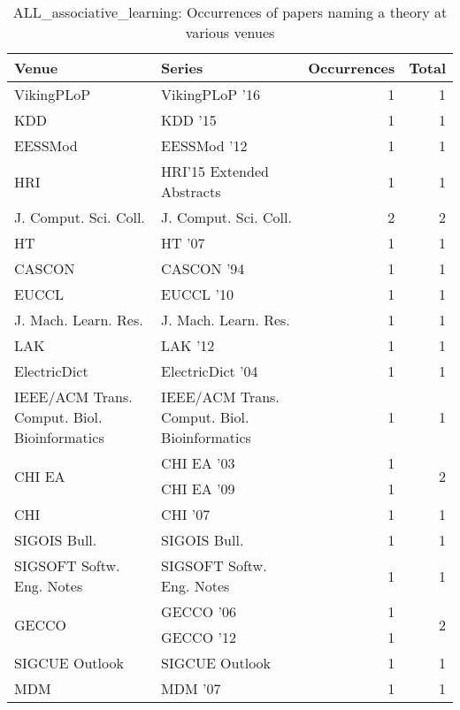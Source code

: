 \begin{table*}[t]
\begin{tabular}{llrr}
Venue & Series & Occurrences & Total\\\hline
\multirow{1}{*}{VikingPLoP } & VikingPLoP '16 & 1 & \multirow{1}{*}{1}\\
\multirow{1}{*}{KDD } & KDD '15 & 1 & \multirow{1}{*}{1}\\
\multirow{1}{*}{EESSMod } & EESSMod '12 & 1 & \multirow{1}{*}{1}\\
\multirow{1}{*}{HRI} & HRI'15 Extended Abstracts & 1 & \multirow{1}{*}{1}\\
\multirow{1}{*}{J. Comput. Sci. Coll.} & J. Comput. Sci. Coll. & 2 & \multirow{1}{*}{2}\\
\multirow{1}{*}{HT } & HT '07 & 1 & \multirow{1}{*}{1}\\
\multirow{1}{*}{CASCON } & CASCON '94 & 1 & \multirow{1}{*}{1}\\
\multirow{1}{*}{EUCCL } & EUCCL '10 & 1 & \multirow{1}{*}{1}\\
\multirow{1}{*}{J. Mach. Learn. Res.} & J. Mach. Learn. Res. & 1 & \multirow{1}{*}{1}\\
\multirow{1}{*}{LAK } & LAK '12 & 1 & \multirow{1}{*}{1}\\
\multirow{1}{*}{ElectricDict } & ElectricDict '04 & 1 & \multirow{1}{*}{1}\\
\multirow{1}{*}{IEEE/ACM Trans. Comput. Biol. Bioinformatics} & IEEE/ACM Trans. Comput. Biol. Bioinformatics & 1 & \multirow{1}{*}{1}\\
\multirow{2}{*}{CHI EA } & CHI EA '03 & 1 & \multirow{2}{*}{2}\\
& CHI EA '09 & 1 &\\
\multirow{1}{*}{CHI } & CHI '07 & 1 & \multirow{1}{*}{1}\\
\multirow{1}{*}{SIGOIS Bull.} & SIGOIS Bull. & 1 & \multirow{1}{*}{1}\\
\multirow{1}{*}{SIGSOFT Softw. Eng. Notes} & SIGSOFT Softw. Eng. Notes & 1 & \multirow{1}{*}{1}\\
\multirow{2}{*}{GECCO } & GECCO '06 & 1 & \multirow{2}{*}{2}\\
& GECCO '12 & 1 &\\
\multirow{1}{*}{SIGCUE Outlook} & SIGCUE Outlook & 1 & \multirow{1}{*}{1}\\
\multirow{1}{*}{MDM } & MDM '07 & 1 & \multirow{1}{*}{1}\\
\end{tabular}
\caption{ALL\_associative\_learning: Occurrences of papers naming a theory at various venues}
\end{table*}